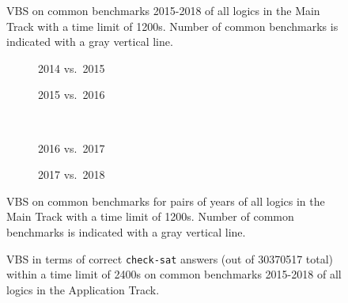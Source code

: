 \documentclass[dvipsnames,table,twoside,11pt]{article}
\newcommand{\maintrack}{Main Track\xspace}
\newcommand{\apptrack}{Application Track\xspace}
\begin{document}

\begin{figure}
  \centering
  \caption{VBS on common benchmarks 2015-2018 of all logics in the \maintrack
  with a time limit of 1200s. Number of common benchmarks is indicated with a
  gray vertical line.}
  \label{fig:progress-all}
\end{figure}

\begin{figure}
  \begin{subfigure}[t]{0.5\textwidth}
    \caption{2014 vs.~2015}
  \end{subfigure}
  \begin{subfigure}[t]{0.5\textwidth}
    \caption{2015 vs.~2016}
  \end{subfigure}
  \\[2ex]
  \begin{subfigure}[t]{0.5\textwidth}
    \caption{2016 vs.~2017}
  \end{subfigure}
  \begin{subfigure}[t]{0.5\textwidth}
    \caption{2017 vs.~2018}
  \end{subfigure}
  \caption{VBS on common benchmarks for pairs of years of all logics in the
  \maintrack with a time limit of 1200s. Number of common benchmarks is
  indicated with a gray vertical line.}
  \label{fig:progress}
\end{figure}

\begin{figure}
  \centering
  \vspace{-5ex}
  \caption{VBS in terms of correct \texttt{check-sat} answers
  (out of 30370517 total)
  within a time limit of 2400s
  on common benchmarks 2015-2018 of all logics in the \apptrack.}
  \label{fig:progress-all-app}
\end{figure}
\end{document}
